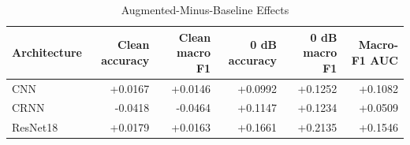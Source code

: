 \begin{table}[t]
  \caption{Augmented-Minus-Baseline Effects}
  \label{tab:augmentation-effects}
  \centering
  \begin{tabular}{lrrrrr}
    \toprule
    Architecture & Clean accuracy & Clean macro F1
      & 0 dB accuracy & 0 dB macro F1 & Macro-F1 AUC \\
    \midrule
    CNN & +0.0167 & +0.0146 & +0.0992 & +0.1252 & +0.1082 \\
    CRNN & -0.0418 & -0.0464 & +0.1147 & +0.1234 & +0.0509 \\
    ResNet18 & +0.0179 & +0.0163 & +0.1661 & +0.2135 & +0.1546 \\
    \bottomrule
  \end{tabular}
\end{table}
